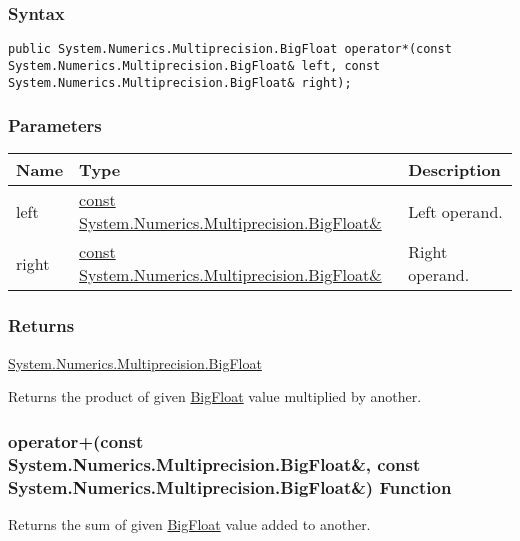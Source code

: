 \documentclass[a4paper,oneside,11.000000pt]{book}
\begin{document}
\subsubsection*{Syntax}
\texttt{public System.Numerics.Multiprecision.BigFloat operator*(const System.Numerics.Multiprecision.BigFloat\& left, const System.Numerics.Multiprecision.BigFloat\& right);}
\subsubsection*{Parameters}
\begin{flushleft}
\begin{supertabular}[l]{!{\raggedright}p{1.30721cm}!{\raggedright}p{8.55945cm}!{\raggedright}p{3.66839cm}}
\textbf{Name}
& \textbf{Type}
& \textbf{Description}
\\
\hline
left
& \hyperlink{System.Numerics.Multiprecision.BigFloat}{const System.\-Numerics.\-Multiprecision.\-BigFloat\&\-}
& Left operand.

\\
right
& \hyperlink{System.Numerics.Multiprecision.BigFloat}{const System.\-Numerics.\-Multiprecision.\-BigFloat\&\-}
& Right operand.

\\
\end{supertabular}

\end{flushleft}
\subsubsection*{Returns}
\hyperlink{System.Numerics.Multiprecision.BigFloat}{System.\-Numerics.\-Multiprecision.\-BigFloat}
\begin{flushleft}
Returns the product of given \hyperlink{System.Numerics.Multiprecision.BigFloat}{BigFloat} value multiplied by another.

\end{flushleft}
\clearpage

\hypertarget{System.Numerics.Multiprecision.operator.plus.C.R.System.Numerics.Multiprecision.BigFloat.C.R.System.Numerics.Multiprecision.BigFloat}{\subsubsection*{operator+(const System.Numerics.Multiprecision.BigFloat\&, const System.Numerics.Multiprecision.BigFloat\&) Function}}
\begin{flushleft}
Returns the sum of given \hyperlink{System.Numerics.Multiprecision.BigFloat}{BigFloat} value added to another.

\end{flushleft}
\end{document}
